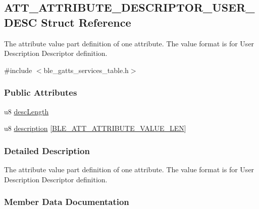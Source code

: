 \hypertarget{struct_a_t_t___a_t_t_r_i_b_u_t_e___d_e_s_c_r_i_p_t_o_r___u_s_e_r___d_e_s_c}{}\subsection{A\+T\+T\+\_\+\+A\+T\+T\+R\+I\+B\+U\+T\+E\+\_\+\+D\+E\+S\+C\+R\+I\+P\+T\+O\+R\+\_\+\+U\+S\+E\+R\+\_\+\+D\+E\+SC Struct Reference}
\label{struct_a_t_t___a_t_t_r_i_b_u_t_e___d_e_s_c_r_i_p_t_o_r___u_s_e_r___d_e_s_c}


The attribute value part definition of one attribute. The value format is for User Description Descriptor definition.  




{\ttfamily \#include $<$ble\+\_\+gatts\+\_\+services\+\_\+table.\+h$>$}

\subsubsection*{Public Attributes}
\begin{DoxyCompactItemize}
\item 
u8 \hyperlink{struct_a_t_t___a_t_t_r_i_b_u_t_e___d_e_s_c_r_i_p_t_o_r___u_s_e_r___d_e_s_c_af0ddadc1c8c5b55547ee1c131ae34fe7}{desc\+Length}
\item 
u8 \hyperlink{struct_a_t_t___a_t_t_r_i_b_u_t_e___d_e_s_c_r_i_p_t_o_r___u_s_e_r___d_e_s_c_abfdcc57fdcf553e38eb41bb53b88714c}{description} \mbox{[}\hyperlink{group___b_l_e___g_a_t_t_ga4d1bd224084bd70c854891e4876dcf6f}{B\+L\+E\+\_\+\+A\+T\+T\+\_\+\+A\+T\+T\+R\+I\+B\+U\+T\+E\+\_\+\+V\+A\+L\+U\+E\+\_\+\+L\+EN}\mbox{]}
\end{DoxyCompactItemize}


\subsubsection{Detailed Description}
The attribute value part definition of one attribute. The value format is for User Description Descriptor definition. 

\subsubsection{Member Data Documentation}
